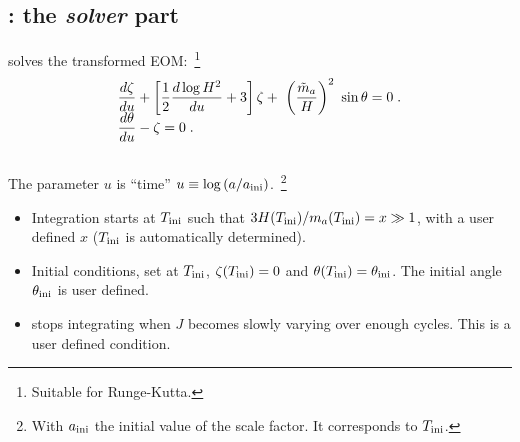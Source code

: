 \documentclass[10pt,utf8,compress,xcolor=dvipsnames]{beamer}
\begin{document}
\subsection{\mimes: the \emph{solver} part}
\begin{frame}{\insertsubsectionhead}
		\vspace{-0.2cm}
		\mimes solves the transformed EOM:~\footnote{Suitable for Runge-Kutta.}
		\begin{eqnarray*}\vspace*{-0.5cm}
			& \dfrac{d  \zeta}{du} + \lrsb{\dfrac{1}{2} \dfrac{d \log H^2}{du} + 3 } \zeta + \ \lrb{\dfrac{\maT}{H}}^2 \ \sin \theta
			=0 \;. \\[-0.2cm]
			&\dfrac{d \theta}{d u} - \zeta=0 \;.
		\end{eqnarray*}\\[-0.2cm]
		The parameter $u$ is ``time'' $u \equiv \log \left( a/a_{\rm ini}{} \right)$.~\footnote{\fontF With $a_{\rm ini}{}$ the initial value of the scale factor. It corresponds to $T_{\rm ini}{}$.} \pause\\[0.5cm]

		
		\begin{itemize}
			\item Integration starts at $T_{\rm ini}{}$ such that $3H(T_{\rm ini}{})/m_{a}{}(T_{\rm ini}{}) = x \gg 1$, with a user defined $x$ ($T_{\rm ini}{}$ is automatically determined).
			\item Initial conditions, set at $T_{\rm ini}{}$, $\zeta(T_{\rm ini}{})=0$ and $\theta(T_{\rm ini}{})=\theta_{\rm ini}{}$. The initial angle $\theta_{\rm ini}{}$ is user defined.
			\item \mimes stops integrating when $J$ becomes slowly varying over enough cycles. This is a user defined condition. 
		\end{itemize}	

	
		
\end{frame}
%
\end{document}
